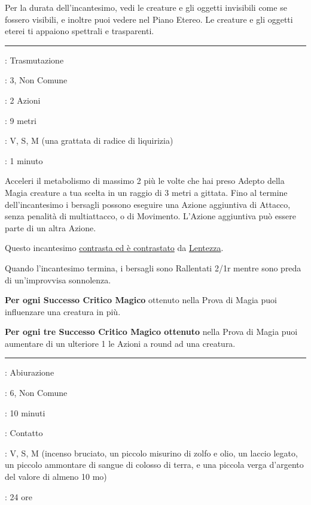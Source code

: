 \begin{multicols}{2}
Per la durata dell'incantesimo, vedi le creature e gli oggetti invisibili come se fossero visibili, e inoltre puoi vedere nel Piano Etereo. Le creature e gli oggetti eterei ti appaiono spettrali e trasparenti.

\smallskip\noindent\rule{\linewidth}{2pt} \hypertarget{Velocità}{}\medskip{}
\noindent
\begin{description}[noitemsep, topsep=0pt, parsep=0pt, partopsep=0pt, leftmargin=0cm, labelwidth=2.8cm]
	\item[\textbf{Lista di Magia}]: Trasmutazione
	\item[\textbf{Livello}]: 3, Non Comune
	\item[\textbf{T. di Lancio}]: 2 Azioni
	\item[\textbf{Gittata}]: 9 metri
	\item[\textbf{Componenti}]: V, S, M (una grattata di radice di liquirizia)
	\item[\textbf{Durata}]: 1 minuto
\end{description}

Acceleri il metabolismo di massimo 2 più le volte che hai preso Adepto della Magia creature a tua scelta in un raggio di 3 metri a gittata. Fino al termine dell'incantesimo i bersagli possono eseguire una Azione aggiuntiva di Attacco, senza penalità di multiattacco, o di Movimento. L'Azione aggiuntiva può essere parte di un altra Azione.

Questo incantesimo \hyperlink{contrastareincantesimi}{contrasta ed è contrastato} da \hyperlink{lentezza}{Lentezza}.

Quando l'incantesimo termina, i bersagli sono Rallentati 2/1r mentre sono preda di un'improvvisa sonnolenza.

\textbf{Per ogni Successo Critico Magico} ottenuto nella Prova di Magia puoi influenzare una creatura in più.

\textbf{Per ogni tre Successo Critico Magico ottenuto} nella Prova di Magia puoi aumentare di un ulteriore 1 le Azioni a round ad una creatura.

\smallskip\noindent\rule{\linewidth}{2pt} \hypertarget{Vigilanza e Interdizione}{}\medskip{}
\noindent
\begin{description}[noitemsep, topsep=0pt, parsep=0pt, partopsep=0pt, leftmargin=0cm, labelwidth=2.8cm]
	\item[\textbf{Lista di Magia}]: Abiurazione
	\item[\textbf{Livello}]: 6, Non Comune
	\item[\textbf{T. di Lancio}]: 10 minuti
	\item[\textbf{Gittata}]: Contatto
	\item[\textbf{Componenti}]: V, S, M (incenso bruciato, un piccolo misurino di zolfo e olio, un laccio legato, un piccolo ammontare di sangue di colosso di terra, e una piccola verga d'argento del valore di almeno 10 mo)
	\item[\textbf{Durata}]: 24 ore
\end{description}


\end{multicols}
